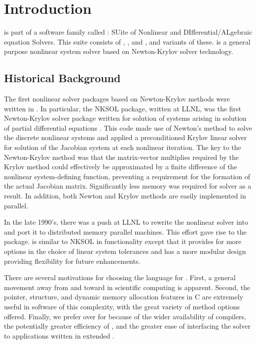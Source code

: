 \chapter{Introduction}\label{s:intro}

{\kinsol} is part of a software family called {\sundials}: SUite
of Nonlinear and DIfferential/ALgebraic equation Solvers. This
suite consists of {\cvode}, {\kinsol}, and {\ida}, and variants of
these.
%
{\kinsol} is a
general purpose nonlinear system solver based on Newton-Krylov
solver technology.

\section{Historical Background}\label{ss:history}

  The first
nonlinear solver packages based on Newton-Krylov methods were
written in {\F}.  In particular, the NKSOL package, written at
LLNL, was the first Newton-Krylov solver package written for
solution of systems arising in solution of partial differential
equations \cite{BrSa:90}.  This {\F} code made use of Newton's
method to solve the discrete nonlinear systems and applied a
preconditioned Krylov linear solver for solution of the Jacobian
system at each nonlinear iteration.  The key to the Newton-Krylov
method was that the matrix-vector multiplies required by the
Krylov method could effectively be approximated by a finite
difference of the nonlinear system-defining function, preventing a
requirement for the formation of the actual Jacobian matrix.
Significantly less memory was required for solver as a result.  In
addition, both Newton and Krylov methods are easily implemented in
parallel.

In the late 1990's, there was a push at LLNL to rewrite the
nonlinear solver into {\C} and port it to distributed memory
parallel machines.  This effort gave rise to the {\kinsol}
package. {\kinsol} is similar to NKSOL in functionality except
that it provides for more options in the choice of linear system
tolerances and has a more modular design providing flexibility for
future enhancements. 

 There are
several motivations for choosing the {\C} language for {\kinsol}.
First, a general movement away from {\F} and toward {\C} in
scientific computing is apparent. Second, the pointer, structure,
and dynamic memory allocation features in C are extremely useful
in software of this complexity, with the great variety of method
options offered. Finally, we prefer {\C} over {\CPP} for {\kinsol}
because of the wider availability of {\C} compilers, the
potentially greater efficiency of {\C}, and the greater ease of
interfacing the solver to applications written in extended {\F}.


